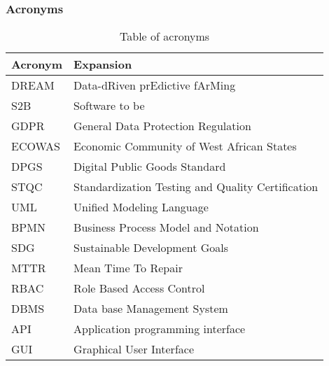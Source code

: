\newpage

\subsubsection{Acronyms}
\begin{table}[H]
    \setlength\arrayrulewidth{1pt}
    \centering
    \begin{tabular}{|l|l|}
        \rowcolor{myblue}
        \hline
        \color{white}Acronym & \color{white}Expansion \\
        \hline
        \textsc{DREAM}  &    Data-dRiven prEdictive fArMing \\
        \hline
        \textsc{S2B}     &   Software to be \\
        \hline
        \textsc{GDPR}  &    General Data Protection Regulation\\
        \hline
        \textsc{ECOWAS}  &    Economic Community of West African States\\
        \hline
        \textsc{DPGS}  &    Digital Public Goods Standard\\
        \hline
        \textsc{STQC}  &    Standardization Testing and Quality Certification\\
        \hline
        \textsc{UML}  &    Unified Modeling Language\\
        \hline
        \textsc{BPMN}  &    Business Process Model and Notation\\
        \hline
        \textsc{SDG}  &    Sustainable Development Goals\\
        \hline
        \textsc{MTTR}  &    Mean Time To Repair\\
        \hline
        \textsc{RBAC}  &    Role Based Access Control \\
        \hline
        \textsc{DBMS}  &    Data base Management System \\
        \hline
        \textsc{API}  &    Application programming interface \\
        \hline
        \textsc{GUI}  &    Graphical User Interface \\
        \hline
    \end{tabular}
    
    \caption{\label{tab:acronymsTable}Table of acronyms}
    
\end{table}

